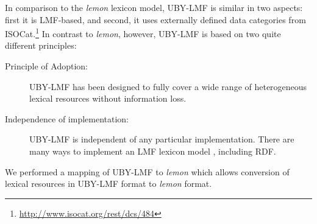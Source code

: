 In comparison to the \emph{lemon} lexicon model,  UBY-LMF is similar in two aspects: first it is LMF-based, and second,
it uses externally defined data categories from
ISOCat.\footnote{\url{http://www.isocat.org/rest/dcs/484}}
In contrast to \emph{lemon}, however, UBY-LMF is based on two quite different principles:
\begin{description} 
\item[Principle of Adoption:]{UBY-LMF has been designed to fully cover a wide range of heterogeneous lexical resources
without information loss.}
\item[Independence of implementation:]{UBY-LMF  is independent of any particular implementation. There are many ways to implement an LMF lexicon model \cite{francopoulo2007lexical}, including RDF.} 
\end{description}




We performed a
mapping of UBY-LMF to \emph{lemon} which allows conversion of lexical resources in UBY-LMF format to \emph{lemon} format.

